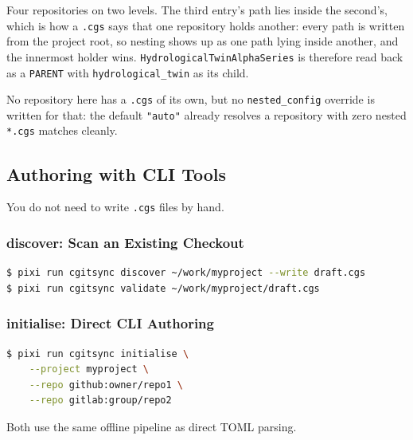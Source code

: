 Four repositories on two levels. The third entry's path lies inside the
second's, which is how a \texttt{.cgs} says that one repository holds
another: every path is written from the project root, so nesting shows up
as one path lying inside another, and the innermost holder wins.
\texttt{HydrologicalTwinAlphaSeries} is therefore read back as a
\texttt{PARENT} with \texttt{hydrological\_twin} as its child.

No repository here has a \texttt{.cgs} of its own, but no
\texttt{nested\_config} override is written for that: the default
\texttt{"auto"} already resolves a repository with zero nested
\texttt{*.cgs} matches cleanly.

\subsection{Authoring with CLI Tools}
\label{subsec:cgs-cli-authoring}

You do not need to write \texttt{.cgs} files by hand.

\subsubsection{discover: Scan an Existing Checkout}

\begin{lstlisting}[language=bash]
$ pixi run cgitsync discover ~/work/myproject --write draft.cgs
$ pixi run cgitsync validate ~/work/myproject/draft.cgs
\end{lstlisting}

\subsubsection{initialise: Direct CLI Authoring}

\begin{lstlisting}[language=bash]
$ pixi run cgitsync initialise \
    --project myproject \
    --repo github:owner/repo1 \
    --repo gitlab:group/repo2
\end{lstlisting}

Both use the same offline pipeline as direct TOML parsing.

